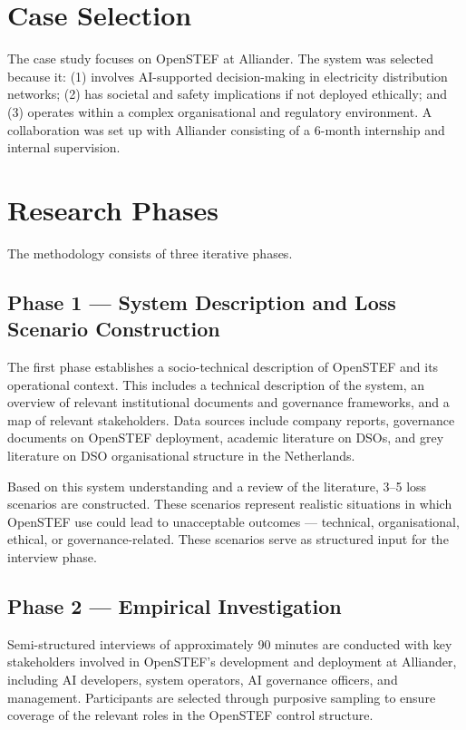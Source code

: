 \section{Case Selection}
\label{sec:case}

The case study focuses on OpenSTEF at Alliander. The system was selected because it: (1) involves AI-supported decision-making in electricity distribution networks; (2) has societal and safety implications if not deployed ethically; and (3) operates within a complex organisational and regulatory environment. A collaboration was set up with Alliander consisting of a 6-month internship and internal supervision.

\section{Research Phases}
\label{sec:phases}

The methodology consists of three iterative phases.

\subsection{Phase 1 — System Description and Loss Scenario Construction}

The first phase establishes a socio-technical description of OpenSTEF and its operational context. This includes a technical description of the system, an overview of relevant institutional documents and governance frameworks, and a map of relevant stakeholders. Data sources include company reports, governance documents on OpenSTEF deployment, academic literature on DSOs, and grey literature on DSO organisational structure in the Netherlands.

Based on this system understanding and a review of the literature, 3--5 loss scenarios are constructed. These scenarios represent realistic situations in which OpenSTEF use could lead to unacceptable outcomes — technical, organisational, ethical, or governance-related. These scenarios serve as structured input for the interview phase.

\subsection{Phase 2 — Empirical Investigation}

Semi-structured interviews of approximately 90 minutes are conducted with key stakeholders involved in OpenSTEF's development and deployment at Alliander, including AI developers, system operators, AI governance officers, and management. Participants are selected through purposive sampling to ensure coverage of the relevant roles in the OpenSTEF control structure.


